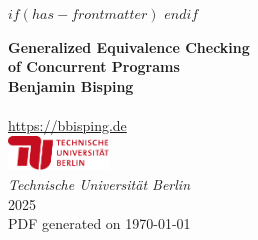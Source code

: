 $if(has-frontmatter)$
\frontmatter
$endif$
%
\makeatletter
  \let\ps@plain\ps@empty
\makeatother
\setlength{\headheight}{15pt}
\addtolength{\headwidth}{\marginparwidth}
\fancyhf{}
\fancyhead[LO]{\nouppercase{\rightmark}}
\fancyhead[RO]{\thepage}
\fancyhead[LE]{\thepage}
\fancyhead[RE]{\nouppercase{\leftmark}}
\renewcommand{\headrulewidth}{0pt}
\pagestyle{fancy}
\begin{titlepage}
    \begin{center}
        {\huge\bfseries Generalized Equivalence Checking \\ of Concurrent Programs\\}
        \vspace{1.5cm}
        \vfill
        {\Large\bfseries Benjamin Bisping}\\
        \\[5pt]
        \url{https://bbisping.de}\\[14pt]
        \vspace{3cm}
        \includegraphics[width=0.2\textwidth]{img/tu-berlin-logo-long-red.pdf}\\[5pt]
        \emph{{Technische Universität Berlin}}\\[2cm]
        \vfill
        {2025}\\
        \vspace{1cm}
        {\small PDF generated on \today}
    \end{center}
\end{titlepage}
\restoregeometry
%


\let\mainmatterforreal=\mainmatter
\renewcommand{\mainmatter}{}